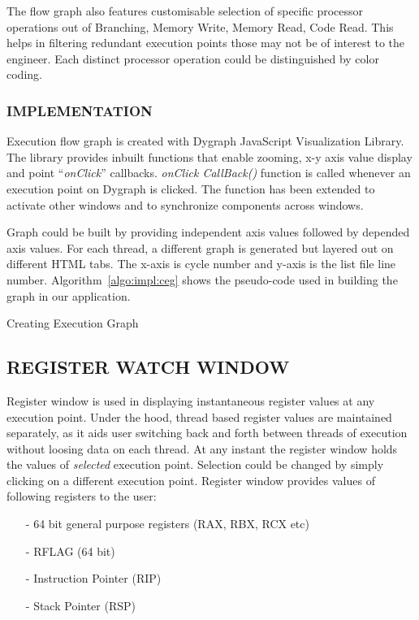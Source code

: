 The flow graph also features customisable selection of specific processor operations out of Branching, Memory Write, Memory Read, Code Read. This helps in filtering redundant execution points those may not be of interest to the engineer. Each distinct processor operation could be distinguished by color coding.   

\subsubsection {IMPLEMENTATION}

Execution flow graph is created with Dygraph JavaScript Visualization Library\cite{http:dygraphs}. The library provides inbuilt functions that enable zooming, x-y axis value display and point ``{\it onClick}'' callbacks. {\it onClick CallBack()} function is called whenever an execution point on Dygraph is clicked. The function has been extended to activate other windows and to synchronize components across windows.

Graph could be built by providing independent axis values followed by depended axis values. For each thread, a different graph is generated but layered out on different HTML tabs. The x-axis is cycle number and y-axis is the list file line number. Algorithm~\ref{algo:impl:ceg} shows the pseudo-code used in building the graph in our application.

\IncMargin{1em}
\begin{algorithm}[h]
\DontPrintSemicolon
{} 
\KwFn{}
\BlankLine
{}
\caption{Creating Execution Graph}
\label{algo:impl:ceg}
\end{algorithm}\DecMargin{1em}

\subsection {REGISTER WATCH WINDOW}
\label{sec:impl:rww}
Register window is used in displaying instantaneous register values at any execution point. Under the hood, thread based register values are maintained separately, as it aids user switching back and forth between threads of execution without loosing data on each thread. At any instant the register window holds the values of {\it selected} execution point. Selection could be changed by simply clicking on a different execution point. Register window provides values of following registers to the user:
\begin{itemize}
	\item[-] 64 bit general purpose registers (RAX, RBX, RCX etc)
	\item[-] RFLAG (64 bit)
	\item[-] Instruction Pointer (RIP)
	\item[-] Stack Pointer (RSP)
\end{itemize}

